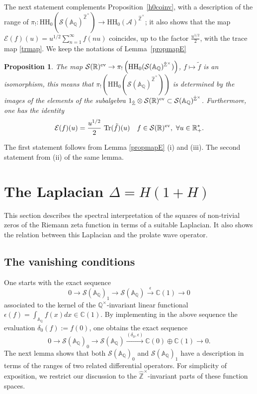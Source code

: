 \documentclass{pspum-l}
\newtheorem{proposition}[theorem]{Proposition}
\theoremstyle{definition}
\theoremstyle{remark}
\numberwithin{equation}{section}
\def\A{{\mathbb A}}
\def\C{{\mathbb C}}
\def\Q{{\mathbb Q}}
\def\R{{\mathbb R}}
\def\Z{{\mathbb Z}}
\def\cA{{\mathcal A}}
\def\cE{{\mathcal E}}
\def\cS{{\mathcal S}}
\def\tr{{\rm Tr}}
\def\hatz{{\hat\Z^\times}}
\def\HH{\text{HH}}
\begin{document}
The next statement complements Proposition~\ref{h0coinv}, with a description of the  range of $\pi_!: \HH_0(\cS(\A_\Q)^{\hatz})\to \HH_0(\cA)^{\hatz}$;  it also shows that the map $\cE(f)(u)=u^{1/2}\sum_{n=1}^\infty f(nu)$ coincides, up to the factor $\frac{u^{1/2}}{2}$, with the trace map \eqref{trmap}. We keep the notations of Lemma~\ref{propmapE}

\begin{proposition}\label{propmapE1}
The map $\cS(\R)^{\rm ev}\to \pi_!\left(\HH_0(\cS(\A_\Q)^{\hatz})\right)$, $f\mapsto \tilde f$ is an isomorphism, this means that  $\pi_!\left(\HH_0(\cS(\A_\Q)^{\hatz})\right)$ is determined by the images of the elements of the subalgebra $1_{\hat \Z}\otimes\cS(\R)^{\rm ev}\subset \cS(\A_\Q)^{\hatz}$. Furthermore, one has the identity
\begin{equation*}\label{hhmapE}
\cE(f)(u)=\frac{u^{1/2}}{2}\ \tr(\tilde f)(u)\quad f\in \cS(\R)^{\rm ev},~\forall u\in \R_+^*.
\end{equation*}
\end{proposition}
\proof The first statement follows from Lemma \ref{propmapE} (i) and (iii). The second statement from (ii) of the same lemma. \endproof  




  \section{The  Laplacian $\Delta=H(1+H)$}\label{sectlapla}
  
  This section describes the spectral interpretation of the squares of non-trivial zeros of the Riemann zeta function in terms of a suitable Laplacian. It also shows the relation between this Laplacian and the prolate wave operator.
  
  \subsection{The vanishing conditions} 
  One starts with the exact sequence
\begin{equation*}\label{fonction1}
0\to \cS(\A_\Q)_1 \to \cS(\A_\Q)\stackrel{\epsilon}{\to} \C(1)\to 0
\end{equation*}
associated to the kernel of the $\Q^\times$-invariant linear functional $\epsilon(f)=\int_{\A_\Q} f(x)dx\in  \C(1)$. By implementing in the above sequence the evaluation $\delta_0(f):=f(0)$, one obtains the exact sequence
\begin{equation*}\label{fonction0}
0\to \cS(\A_\Q)_0 \to \cS(\A_\Q)\stackrel{(\delta_0,\epsilon)}{\longrightarrow} \C(0)\oplus \C(1)\to 0.
\end{equation*}
The next lemma shows that both $\cS(\A_\Q)_0$ and $\cS(\A_\Q)_1$ have a description in terms of the ranges of two related differential operators. For simplicity of exposition, we restrict our discussion to the $\hatz$-invariant parts of these function spaces.
\end{document}
